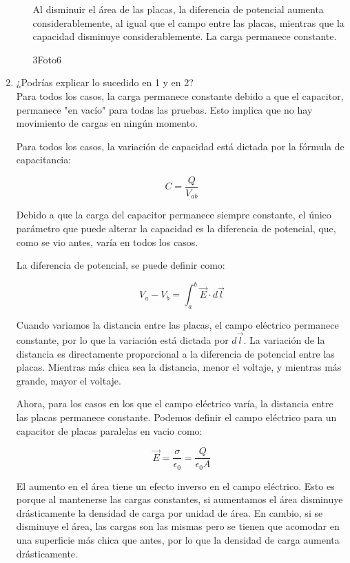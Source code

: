 \documentclass[12pt]{report}
\begin{document}
\begin{enumerate}
\begin{enumerate}
        Al disminuir el área de las placas, la diferencia de potencial aumenta considerablemente, al igual que el campo entre las placas, mientras que la capacidad disminuye considerablemente. La carga permanece constante.

        3Foto6
        \\
    \end{enumerate}
    \item ¿Podrías explicar lo sucedido en 1 y en 2?
    \\
    Para todos los casos, la carga permanece constante debido a que el capacitor, permanece "en vacío" para todas las pruebas. Esto implica que no hay movimiento de cargas en ningún momento.

    Para todos los casos, la variación de capacidad está dictada por la fórmula de capacitancia:

\[C=\frac{Q}{V_{ab}}\]

    Debido a que la carga del capacitor permanece siempre constante, el único parámetro que puede alterar la capacidad es la diferencia de potencial, que, como se vio antes, varía en todos los casos.
    
    La diferencia de potencial, se puede definir como:
    
\[V_a-V_b=\int_{a}^{b}\vec{E}\cdot d \vec{l}\]

    Cuando variamos la distancia entre las placas, el campo eléctrico permanece constante, por lo que la variación está dictada por \(d \vec{l}\). La variación de la distancia es directamente proporcional a la diferencia de potencial entre las placas. Mientras más chica sea la distancia, menor el voltaje, y mientras más grande, mayor el voltaje.

    Ahora, para los casos en los que el campo eléctrico varía, la distancia entre las placas permanece constante. Podemos definir el campo eléctrico para un capacitor de placas paralelas en vacio como:
    
\[\vec{E}=\frac{\sigma}{\epsilon_0}=\frac{Q}{\epsilon_0 A}\]

    El aumento en el área tiene un efecto inverso en el campo eléctrico. Esto es porque al mantenerse las cargas constantes, si aumentamos el área disminuye drásticamente la densidad de carga por unidad de área. En cambio, si se disminuye el área, las cargas son las mismas pero se tienen que acomodar en una superficie más chica que antes, por lo que la densidad de carga aumenta drásticamente.

\end{enumerate}
\end{document}
